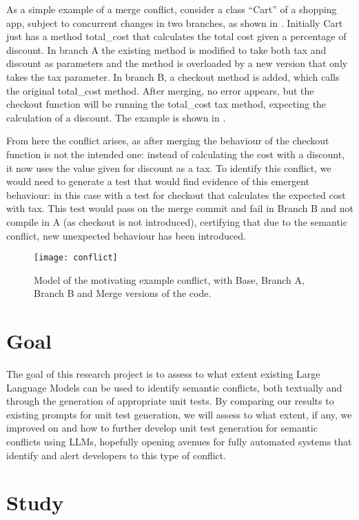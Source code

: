 As a simple example of a merge conflict, consider a class ``Cart'' of a shopping app, subject to concurrent changes in two branches, as shown in .
Initially Cart just has a method total\_cost that calculates the total cost given a percentage of discount.
In branch A the existing method is modified to take both tax and discount as parameters and the method is overloaded by a new version that only takes the tax parameter.
In branch B, a checkout method is added, which calls the original total\_cost method. After merging, no error appears, but the checkout function will be running the total\_cost tax method, expecting the calculation of a discount. The example is shown in .

From here the conflict arises, as after merging the behaviour of the checkout function is not the intended one: instead of calculating the cost with a discount, it now uses the value given for discount as a tax.
To identify this conflict, we would need to generate a test that would find evidence of this emergent behaviour: in this case with a test for checkout that calculates the expected cost with tax. This test would pass on the merge commit and fail in Branch B and not compile in A (as checkout is not introduced),
certifying that due to the semantic conflict, new unexpected behaviour has been introduced.

\begin{figure}[t]
    \texttt{[image: conflict]}
    \caption{Model of the motivating example conflict, with Base, Branch A, Branch B and Merge versions of the code.}
    \label{fig:conflict}
\end{figure}

\section{Goal} \label{sec:goal}

The goal of this research project is to assess to what extent existing Large Language Models can be used to identify semantic conflicts, both textually and through the generation
of appropriate unit tests. By comparing our results to existing prompts for unit test generation, we will assess to what extent, if any, we improved on and how to further develop
unit test generation for semantic conflicts using LLMs, hopefully opening avenues for fully automated systems that identify and alert developers to this type of conflict.

\section{Study} \label{sec:study}

